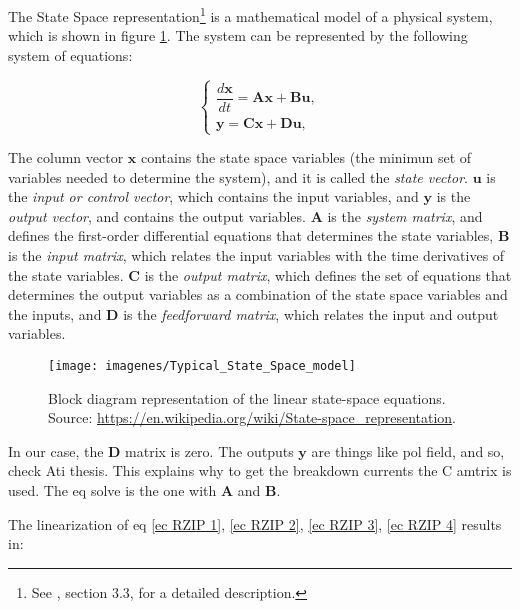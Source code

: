 \documentclass[a4paper,12pt,oneside]{book}
\begin{document}
The State Space representation\footnote{See \cite{Nise}, section 3.3, for a detailed description.} is a mathematical model of a physical system, which is shown in figure \ref{diagrama state space}. The system can be represented by the following system of equations:

\begin{equation} \label{ec stat spa, general}
\left\{
\begin{array}{c}
\dfrac{d\boldsymbol{x}}{dt}=\boldsymbol{A} \boldsymbol{x} +\boldsymbol{B} \boldsymbol{u}, \\
\boldsymbol{y}=\boldsymbol{C}\boldsymbol{x} +\boldsymbol{D} \boldsymbol{u},
\end{array}
\right.
\end{equation}

The column vector $\boldsymbol{x}$ contains the state space variables (the minimun set of variables needed to determine the system), and it is called the \textit{state vector}. $\boldsymbol{u}$ is the \textit{input or control vector}, which contains the input variables, and $\boldsymbol{y}$ is the \textit{output vector}, and contains the output variables. $\boldsymbol{A}$ is the \textit{system matrix}, and defines the first-order differential equations that determines the state variables, $\boldsymbol{B}$ is the \textit{input matrix}, which relates the input variables with the time derivatives of the state variables. $\boldsymbol{C}$ is the \textit{output matrix}, which defines the set of equations that determines the output variables as a combination of the state space variables and the inputs, and $\boldsymbol{D}$ is the \textit{feedforward matrix}, which relates the input and output variables.

\begin{figure}[htbp]

    \centering
\texttt{[image: imagenes/Typical\_State\_Space\_model]}
\caption{Block diagram representation of the linear state-space equations. Source: \url{https://en.wikipedia.org/wiki/State-space_representation}.}
\label{diagrama state space}
\end{figure}

In our case, the $\boldsymbol{D}$ matrix is zero. The outputs $\boldsymbol{y}$ are things like pol field, and so, check Ati thesis. This explains why to get the breakdown currents the C amtrix is used.  The eq solve is the one with $\boldsymbol{A}$ and $\boldsymbol{B}$.


%


The linearization of eq \eqref{ec RZIP 1}, \eqref{ec RZIP 2}, \eqref{ec RZIP 3}, \eqref{ec RZIP 4} results in:
\end{document}
